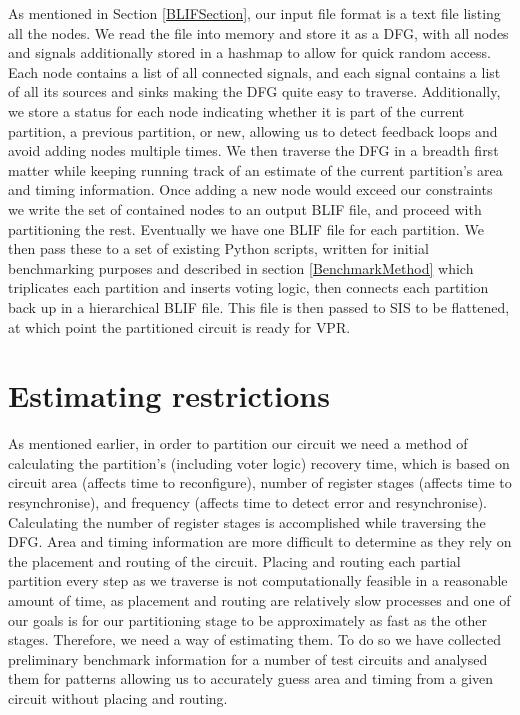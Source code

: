 \documentclass[12pt,final,oneside]{dwThesis} %
\begin{document}
As mentioned in Section \ref{BLIFSection}, our input file format is a text file listing all the nodes. We read the file into memory and store it as a \ac{DFG}, with all nodes and signals additionally stored in a hashmap to allow for quick random access. Each node contains a list of all connected signals, and each signal contains a list of all its sources and sinks making the \ac{DFG} quite easy to traverse. Additionally, we store a status for each node indicating whether it is part of the current partition, a previous partition, or new, allowing us to detect feedback loops and avoid adding nodes multiple times.
We then traverse the \ac{DFG} in a breadth first matter while keeping running track of an estimate of the current partition's area and timing information. Once adding a new node would exceed our constraints we write the set of contained nodes to an output \ac{BLIF} file, and proceed with partitioning the rest. Eventually we have one \ac{BLIF} file for each partition. We then pass these to a set of existing Python scripts, written for initial benchmarking purposes and described in section \ref{BenchmarkMethod} which triplicates each partition and inserts voting logic, then connects each partition back up in a hierarchical \ac{BLIF} file. This file is then passed to \ac{SIS} to be flattened, at which point the partitioned circuit is ready for \ac{VPR}.


\section{Estimating restrictions}
As mentioned earlier, in order to partition our circuit we need a method of calculating the partition's (including voter logic) recovery time, which is based on circuit area (affects time to reconfigure), number of register stages (affects time to resynchronise), and frequency (affects time to detect error and resynchronise). Calculating the number of register stages is accomplished while traversing the \ac{DFG}.
Area and timing information are more difficult to determine as they rely on the placement and routing of the circuit. Placing and routing each partial partition every step as we traverse is not computationally feasible in a reasonable amount of time, as placement and routing are relatively slow processes and one of our goals is for our partitioning stage to be approximately as fast as the other stages. Therefore, we need a way of estimating them. To do so we have collected preliminary benchmark information for a number of test circuits and analysed them for patterns allowing us to accurately guess area and timing from a given circuit without placing and routing.
\end{document}
